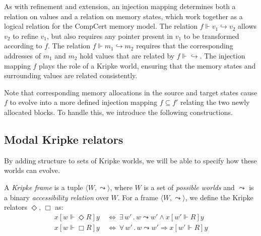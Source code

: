 \documentclass[sigplan,10pt,review,anonymous]{acmart}
\newcommand{\ifr}[1]{\mathrel{[{#1}]}}
\begin{document}
As with refinement and extension,
an injection mapping determines both
a relation on values and
a relation on memory states,
which work together
as a logical relation for the CompCert memory model.
The relation $f \Vdash v_1 \hookrightarrow v_2$
allows $v_2$ to refine $v_1$,
but also requires any pointer present in $v_1$ 
to be transformed according to $f$.
The relation $f \Vdash m_1 \hookrightarrow m_2$
requires that the corresponding addresses of $m_1$ and $m_2$
hold values that are related by $f \Vdash {\hookrightarrow}$.
The injection mapping $f$ plays the role of a Kripke world,
ensuring that the memory states and surrounding values
are related consistently.

Note that corresponding memory allocations
in the source and target states cause $f$ to
evolve into a more defined injection mapping $f \subseteq f'$
relating the two newly allocated blocks.
To handle this,
we introduce the following constructions.


\subsection{Modal Kripke relators} %

By adding structure to sets of Kripke worlds,
we will be able to
specify how these worlds can evolve.

\begin{definition} %
A \emph{Kripke frame} is a tuple
$\langle W, {\leadsto} \rangle$, where
$W$ is a set of \emph{possible worlds} and
$\leadsto$ is a
binary \emph{accessibility relation} over $W$.
For a frame
$\langle W, \leadsto \rangle$,
we define the Kripke relators $\Diamond$, $\Box$ as:
\begin{align*}
  x \ifr{w \Vdash \Diamond R} y & \: \Leftrightarrow \:
    \exists \, w' \,.\, w \leadsto w' \wedge
      x \ifr{w' \Vdash R} y \\
  x \ifr{w \Vdash \Box R} y & \: \Leftrightarrow \:
    \forall \, w' \,.\, w \leadsto w' \Rightarrow
      x \ifr{w' \Vdash R} y
\end{align*}
\end{definition}
\end{document}
